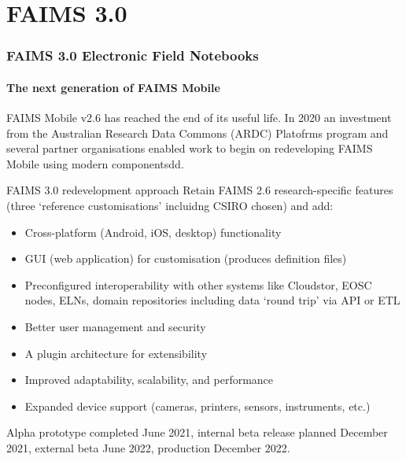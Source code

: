 

\section{FAIMS 3.0}

\begin{sectionframe} %
	\frametitle{FAIMS 3.0 Electronic Field Notebooks}
	\framesubtitle{The next generation of FAIMS Mobile}

    \vfill
    
    FAIMS Mobile v2.6 has reached the end of its useful life. In 2020 an investment from the Australian Research Data Commons (ARDC) Platofrms program and several partner organisations enabled work to begin on redeveloping FAIMS Mobile using modern componentsdd.
\end{sectionframe}


\begin{frame}{FAIMS 3.0 redevelopment approach}
Retain FAIMS 2.6 research-specific features (three ‘reference customisations’ incluidng CSIRO chosen) and add:
    \begin{itemize}
        \item Cross-platform (Android, iOS, desktop) functionality
        \item GUI (web application) for customisation (produces definition files)
        \item Preconfigured interoperability with other systems like Cloudstor, EOSC nodes, ELNs, domain repositories including data ‘round trip’ via API or ETL
        \item Better user management and security
        \item A plugin architecture for extensibility
        \item Improved adaptability, scalability, and performance
        \item Expanded device support (cameras, printers, sensors, instruments, etc.)
    \end{itemize}
    \vfill
    Alpha prototype completed June 2021, internal beta release planned December 2021, external beta June 2022, production December 2022.
\end{frame}

